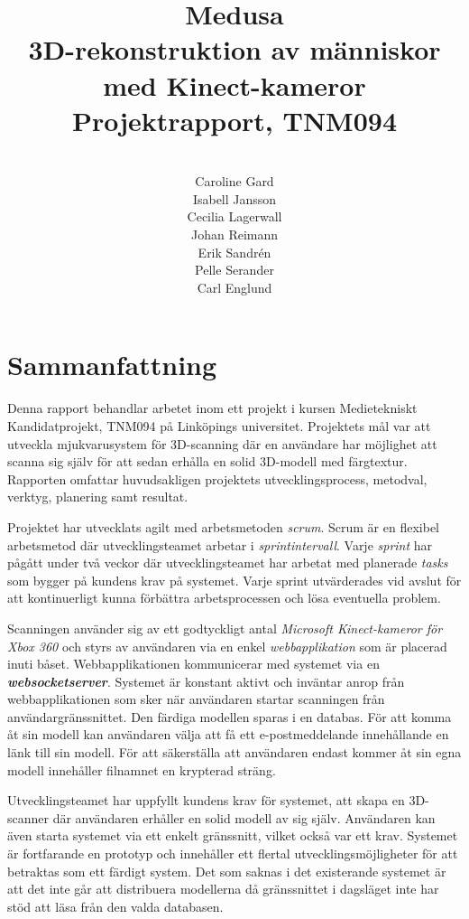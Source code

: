 \documentclass[a4paper,12pt,oneside,final]{extbook}
\title{{\Huge \bfseries Medusa}\\ {\large 3D-rekonstruktion av människor med Kinect-kameror\\Projektrapport, TNM094}}
\author{\\Caroline Gard\\Isabell Jansson\\Cecilia Lagerwall\\Johan Reimann\\Erik Sandrén\\Pelle Serander\\Carl Englund}
\begin{document}
\pagestyle{empty}
\thispagestyle{empty}

\frontmatter

\maketitle

\newpage\null\thispagestyle{empty}\newpage
\setcounter{page}{1}
\pagestyle{fancy}

\chapter{Sammanfattning}
Denna rapport behandlar arbetet inom ett projekt i kursen Medietekniskt Kandidatprojekt, TNM094 på Linköpings universitet. Projektets mål var att utveckla mjukvarusystem för 3D-scanning där en användare har möjlighet att scanna sig själv för att sedan erhålla en solid 3D-modell med färgtextur. Rapporten omfattar huvudsakligen projektets utvecklingsprocess, metodval, verktyg, planering samt resultat.

Projektet har utvecklats agilt med arbetsmetoden \emph{scrum}. Scrum är en flexibel arbetsmetod där utvecklingsteamet arbetar i \emph{sprintintervall}. Varje \emph{sprint} har pågått under två veckor där utvecklingsteamet har arbetat med planerade \emph{tasks} som bygger på kundens krav på systemet. Varje sprint utvärderades vid avslut för att kontinuerligt kunna förbättra arbetsprocessen och lösa eventuella problem.

Scanningen använder sig av ett godtyckligt antal \emph{Microsoft Kinect-kameror för Xbox 360} och styrs av användaren via en enkel \emph{webbapplikation} som är placerad inuti båset. Webbapplikationen kommunicerar med systemet via en \emph{\textbf{websocketserver}}. Systemet är konstant aktivt och inväntar anrop från webbapplikationen som sker när användaren startar scanningen från användargränssnittet. Den färdiga modellen sparas i en databas. För att komma åt sin modell kan användaren välja att få ett e-postmeddelande innehållande en länk till sin modell. För att säkerställa att användaren endast kommer åt sin egna modell innehåller filnamnet en krypterad sträng.

Utvecklingsteamet har uppfyllt kundens krav för systemet, att skapa en 3D-scanner där användaren erhåller en solid modell av sig själv. Användaren kan även starta systemet via ett enkelt gränssnitt, vilket också var ett krav. Systemet är fortfarande en prototyp och innehåller ett flertal utvecklingsmöjligheter för att betraktas som ett färdigt system. Det som saknas i det existerande systemet är att det inte går att distribuera modellerna då gränssnittet i dagsläget inte har stöd att läsa från den valda databasen.
\end{document}
